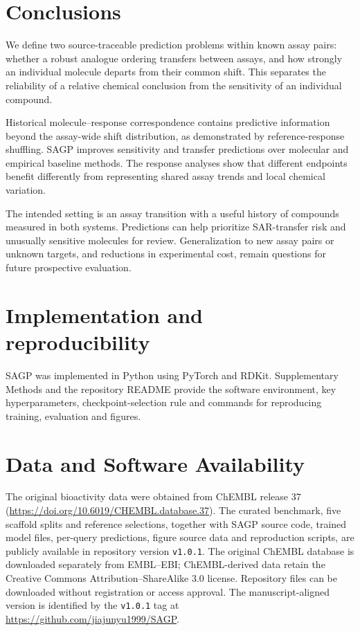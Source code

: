 \documentclass[letterpaper]{article}
\begin{document}
\section{Conclusions}

We define two source-traceable prediction problems within known assay pairs: whether a robust analogue ordering transfers between assays, and how strongly an individual molecule departs from their common shift. This separates the reliability of a relative chemical conclusion from the sensitivity of an individual compound.

Historical molecule--response correspondence contains predictive information beyond the assay-wide shift distribution, as demonstrated by reference-response shuffling. SAGP improves sensitivity and transfer predictions over molecular and empirical baseline methods. The response analyses show that different endpoints benefit differently from representing shared assay trends and local chemical variation.

The intended setting is an assay transition with a useful history of compounds measured in both systems. Predictions can help prioritize SAR-transfer risk and unusually sensitive molecules for review. Generalization to new assay pairs or unknown targets, and reductions in experimental cost, remain questions for future prospective evaluation.

\section{Implementation and reproducibility}

SAGP was implemented in Python using PyTorch and RDKit. Supplementary Methods and the repository README provide the software environment, key hyperparameters, checkpoint-selection rule and commands for reproducing training, evaluation and figures.

\section{Data and Software Availability}

The original bioactivity data were obtained from ChEMBL release 37 (\url{https://doi.org/10.6019/CHEMBL.database.37}). The curated benchmark, five scaffold splits and reference selections, together with SAGP source code, trained model files, per-query predictions, figure source data and reproduction scripts, are publicly available in repository version \texttt{v1.0.1}. The original ChEMBL database is downloaded separately from EMBL--EBI; ChEMBL-derived data retain the Creative Commons Attribution--ShareAlike 3.0 license. Repository files can be downloaded without registration or access approval. The manuscript-aligned version is identified by the \texttt{v1.0.1} tag at \url{https://github.com/jiajunyu1999/SAGP}.



\end{document}
